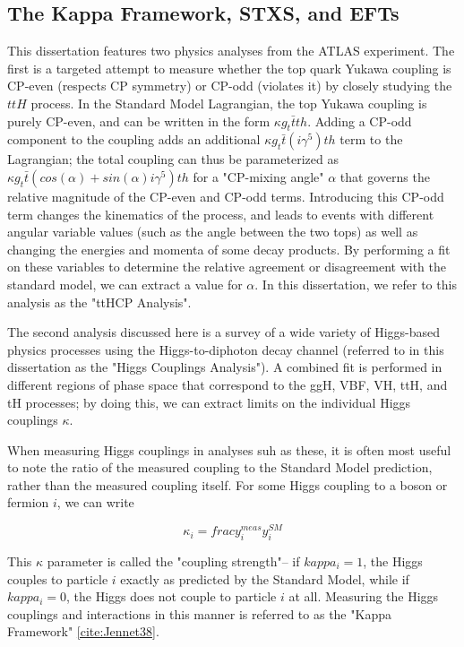 \subsection{The Kappa Framework, STXS, and EFTs} \label{sec:kappaFW}

This dissertation features two physics analyses from the ATLAS experiment. The first is a targeted attempt to measure whether the top quark Yukawa coupling is CP-even (respects CP symmetry) or CP-odd (violates it) by closely studying the $ttH$ process. In the Standard Model Lagrangian, the top Yukawa coupling is purely CP-even, and can be written in the form $\kappa g_{t} \bar{t}th$. Adding a CP-odd component to the coupling adds an additional $\kappa g_{t} \bar{t} (i \gamma^{5})th$ term to the Lagrangian; the total coupling can thus be parameterized as $\kappa g_{t} \bar{t} (cos(\alpha)+ sin(\alpha) i \gamma^{5} )th$ for a "CP-mixing angle" $\alpha$ that governs the relative magnitude of the CP-even and CP-odd terms. Introducing this CP-odd term changes the kinematics of the process, and leads to events with different angular variable values (such as the angle between the two tops) as well as changing the energies and momenta of some decay products. By performing a fit on these variables to determine the relative agreement or disagreement with the standard model, we can extract a value for $\alpha$. In this dissertation, we refer to this analysis as the "ttHCP Analysis".

The second analysis discussed here is a survey of a wide variety of Higgs-based physics processes using the Higgs-to-diphoton decay channel (referred to in this dissertation as the "Higgs Couplings Analysis"). A combined fit is performed in different regions of phase space that correspond to the ggH, VBF, VH, ttH, and tH processes; by doing this, we can extract limits on the individual Higgs couplings $\kappa$.

When measuring Higgs couplings in analyses suh as these, it is often most useful to note the ratio of the measured coupling to the Standard Model prediction, rather than the measured coupling itself. For some Higgs coupling to a boson or fermion $i$, we can write

\begin{equation}
\kappa_{i} = frac{y_{i}^{meas}}{y_{i}^{SM}}
\end{equation}

This $\kappa$ parameter is called the "coupling strength"-- if $kappa_{i} = 1$, the Higgs couples to particle $i$ exactly as predicted by the Standard Model, while if $kappa_{i} = 0$, the Higgs does not couple to particle $i$ at all. Measuring the Higgs couplings and interactions in this manner is referred to as the "Kappa Framework" \ref{cite:Jennet38}.

